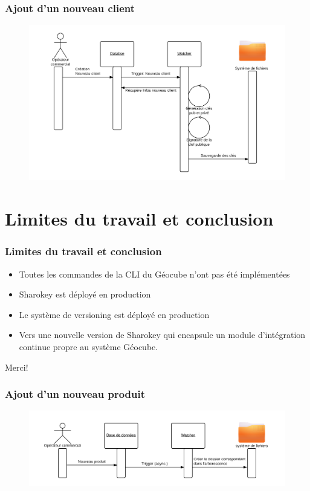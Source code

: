 \documentclass{beamer}
\begin{document}
\begin{frame}
\frametitle{Ajout d'un nouveau client}
\begin{figure}
\centering
\includegraphics[scale=0.5]{images/1.png}
\end{figure}
\end{frame}

\section{Limites du travail et conclusion}
\begin{frame}
\frametitle{Limites du travail et conclusion}
\begin{itemize}
\item Toutes les commandes de la CLI du Géocube n'ont pas été implémentées
\item Sharokey est déployé en production
\item Le système de versioning est déployé en production
\item Vers une nouvelle version de Sharokey qui encapsule un module d'intégration continue propre au système Géocube.

\end{itemize}
\end{frame}





\begin{frame}
\Huge{\centerline{Merci!}}
\end{frame}

\begin{frame}
\frametitle{Ajout d'un nouveau produit}
\begin{figure}
\centering
\includegraphics[scale=0.6]{images/2.png}
\end{figure}
\end{frame}
\end{document}
